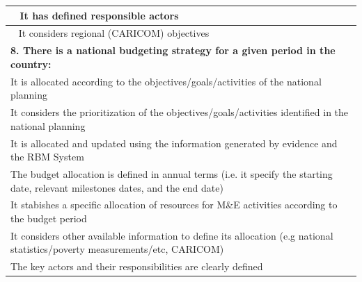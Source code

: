 \documentclass[
  10pt,
]{book}
\begin{document}
\begin{table}
\begin{tabular}[t]{l}
\hline
\hspace{1em}  It has defined responsible actors\\
\hline
\hspace{1em}  It considers regional (CARICOM) objectives\\
\hline
\multicolumn{1}{l}{\textbf{8. There is a national budgeting strategy for a given period in the country:}}\\
\hline
\hspace{1em}It is allocated according to the objectives/goals/activities of the national planning\\
\hline
\hspace{1em}It considers the prioritization of the objectives/goals/activities identified in the national planning\\
\hline
\hspace{1em}It is allocated and updated using the information generated by evidence and the RBM System\\
\hline
\hspace{1em}The budget allocation is defined in annual terms (i.e. it specify the starting date, relevant milestones dates, and the end date)\\
\hline
\hspace{1em}It stabishes a specific allocation of resources for M\&E activities according to the budget period\\
\hline
\hspace{1em}It considers other available information to define its allocation (e.g national statistics/poverty measurements/etc, CARICOM)\\
\hline
\hspace{1em}The key actors and their responsibilities are clearly defined\\
\hline
\end{tabular}
\end{table}
\end{document}
